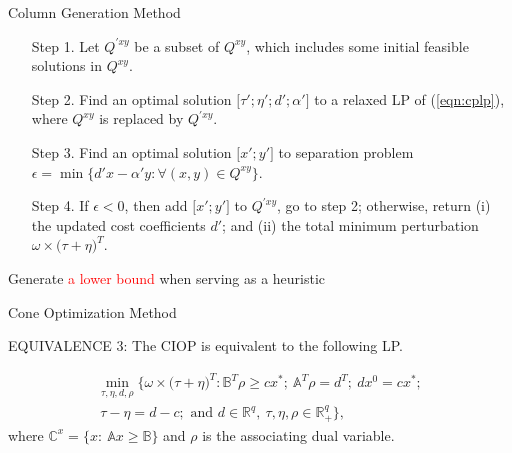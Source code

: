 \documentclass[14pt]{beamer}
\newcommand{\R}{\mathbb{R}}
\newcommand{\Z}{\mathbb{Z}}
\begin{document}
\begin{frame}{Column Generation Method}
\begin{itemize}
\justifying
\footnotesize
\item[Step 1.] Let $Q^{'xy}$ be a subset of $Q^{xy}$, which includes some initial feasible solutions in $Q^{xy}$.
\item[Step 2.] Find an optimal solution $\big[\tau';\eta';d';\alpha'\big]$ to a relaxed LP of (\ref{eqn:cplp}), where $Q^{xy}$ is replaced by $Q^{'xy}$. 
\item[Step 3.]
Find an optimal solution $\big[x';y'\big]$ to separation problem $\epsilon = \min \big\{ d'x - \alpha' y: \forall (x,y) \in Q^{xy}\big\}$.
\item[Step 4.]
If $\epsilon<0$, then add $\big[x';y'\big]$ to $Q^{'xy}$, go to step 2; otherwise, return (i) the updated cost coefficients $d'$; and (ii) the total minimum perturbation $\omega \times \big( \tau + \eta \big)^T$.
\end{itemize}
\begin{shaded}
\centering
Generate \textcolor{red}{a lower bound} when serving as a heuristic
\end{shaded}
\end{frame}


\begin{frame}{Cone Optimization Method}
\begin{lemma}\label{lemma:equivalence1}
\centering
\small
EQUIVALENCE 3: The CIOP is equivalent to the following LP.
\end{lemma}
\small
\begin{eqnarray*}\label{eqn:colp2}
\min_{\tau,\eta,d,\rho} \big\{\omega \times \big( \tau+\eta \big)^T: \mathbb{B}^T\rho \geq cx^*;~\mathbb{A}^T\rho = d^T;~dx^0 = cx^*;\\
~ \tau - \eta =  d-c; \mbox{ and } d \in \R^{q}, ~\tau, \eta, \rho \in \R^{q}_+\big\},
\end{eqnarray*}
\centering
where $\mathbb{C}^x = \{x:~\mathbb{A}x \geq \mathbb{B}\}$ and $\rho$ is the associating dual variable.
\end{frame}
\end{document}
